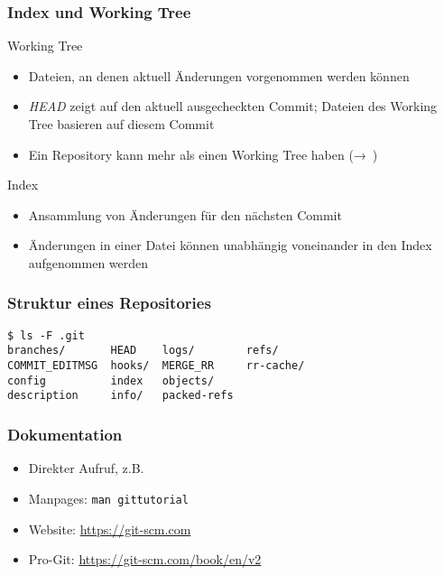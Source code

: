\documentclass{cms-kurs}
\begin{document}
\begin{frame}
  \frametitle{Index und Working Tree}

  \onslide<+->

  \begin{block}{Working Tree}
    \begin{itemize}
    \item Dateien, an denen aktuell Änderungen vorgenommen werden können
    \item \emph{HEAD} zeigt auf den aktuell ausgecheckten Commit; Dateien des
      Working Tree basieren auf diesem Commit
    \item Ein Repository kann mehr als einen Working Tree haben
      (→ )
    \end{itemize}
  \end{block}

  \medskip{}

  \begin{block}{Index}
    \begin{itemize}
    \item Ansammlung von Änderungen für den nächsten Commit
    \item Änderungen in einer Datei können unabhängig voneinander in den Index
      aufgenommen werden
    \end{itemize}
  \end{block}
\end{frame}

\begin{frame}[fragile]
  \frametitle{Struktur eines Repositories}

  \onslide<+->

\begin{verbatim}
$ ls -F .git
branches/       HEAD    logs/        refs/
COMMIT_EDITMSG  hooks/  MERGE_RR     rr-cache/
config          index   objects/
description     info/   packed-refs
\end{verbatim}

\end{frame}

\begin{frame}
  \frametitle{Dokumentation}

  \onslide<+->

  \begin{itemize}
  \item Direkter Aufruf, z.B.{} 
  \item Manpages: \lstinline{man gittutorial}
  \item Website: \url{https://git-scm.com}
  \item Pro-Git: \url{https://git-scm.com/book/en/v2}
  \end{itemize}

\end{frame}
\end{document}
